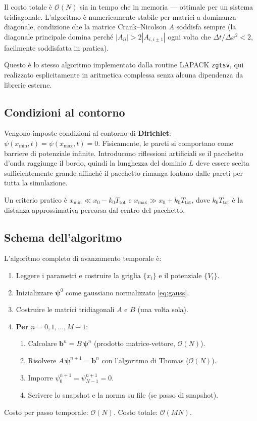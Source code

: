 \documentclass[12pt, a4paper]{article}
\newcommand{\dt}{\Delta t}
\newcommand{\dx}{\Delta x}
\newcommand{\CN}{Crank--Nicolson}
\begin{document}
Il costo totale è $\mathcal{O}(N)$ sia in tempo che in memoria ---
ottimale per un sistema tridiagonale.  L'algoritmo è numericamente
stabile per matrici a dominanza diagonale, condizione che la matrice
\CN{} $A$ soddisfa sempre (la diagonale principale domina perché
$|A_{ii}| > 2|A_{i,i\pm 1}|$ ogni volta che $\dt/\dx^2 < 2$,
facilmente soddisfatta in pratica).

Questo è lo stesso algoritmo implementato dalla routine LAPACK
\texttt{zgtsv}, qui realizzato esplicitamente in aritmetica complessa
senza alcuna dipendenza da librerie esterne.

\subsection{Condizioni al contorno}

Vengono imposte condizioni al contorno di \textbf{Dirichlet}:
$\psi(x_\text{min},t) = \psi(x_\text{max},t) = 0$.  Fisicamente,
le pareti si comportano come barriere di potenziale infinite.
Introducono riflessioni artificiali se il pacchetto d'onda raggiunge
il bordo, quindi la lunghezza del dominio $L$ deve essere scelta
sufficientemente grande affinché il pacchetto rimanga lontano dalle
pareti per tutta la simulazione.

Un criterio pratico è $x_\text{min} \ll x_0 - k_0 T_\text{tot}$ e
$x_\text{max} \gg x_0 + k_0 T_\text{tot}$, dove $k_0 T_\text{tot}$
è la distanza approssimativa percorsa dal centro del pacchetto.

\subsection{Schema dell'algoritmo}

L'algoritmo completo di avanzamento temporale è:

\begin{enumerate}
  \item Leggere i parametri e costruire la griglia $\{x_i\}$ e il
        potenziale $\{V_i\}$.
  \item Inizializzare $\boldsymbol{\psi}^0$ come gaussiano
        normalizzato \eqref{eq:gauss}.
  \item Costruire le matrici tridiagonali $A$ e $B$ (una volta sola).
  \item \textbf{Per} $n = 0, 1, \ldots, M-1$:
  \begin{enumerate}
    \item[(a)] Calcolare $\mathbf{b}^n = B\,\boldsymbol{\psi}^n$
               (prodotto matrice-vettore, $\mathcal{O}(N)$).
    \item[(b)] Risolvere $A\,\boldsymbol{\psi}^{n+1} = \mathbf{b}^n$
               con l'algoritmo di Thomas ($\mathcal{O}(N)$).
    \item[(c)] Imporre $\psi_0^{n+1} = \psi_{N-1}^{n+1} = 0$.
    \item[(d)] Scrivere lo snapshot e la norma su file (se passo
               di snapshot).
  \end{enumerate}
\end{enumerate}
Costo per passo temporale: $\mathcal{O}(N)$.  Costo totale:
$\mathcal{O}(MN)$.
\end{document}
